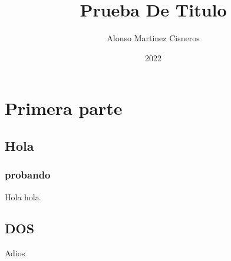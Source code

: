 \documentclass[colorful]{sty/itam-thesis}
\author{Alonso Martinez Cisneros}
\title{Prueba De Titulo}
\date{2022}
\begin{document}
\frontmatter
\maketitle
\makefrontmatter

\mainmatter

\part{Primera parte}
\chapter{Hola}

\lipsum[1-10]

\section{probando}
Hola hola

\chapter{DOS}

Adios
\end{document}
